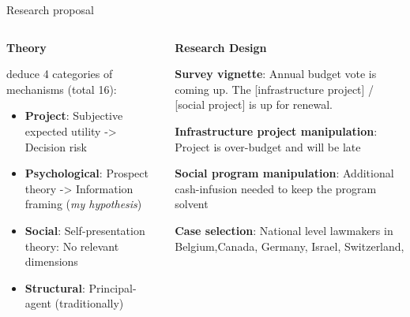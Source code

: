 \begin{frame}{Research proposal}

\begin{columns}
  \begin{column}[T]{0.475\textwidth}
    \textbf{\color{kon4}Theory}

    \vspace*{0.2cm}

  \textcite[][]{Sleesman2012} deduce 4 categories of mechanisms (total 16):
  \begin{itemize}
    \item \textbf{Project}: Subjective expected utility -> Decision risk
    \item \textbf{Psychological}: Prospect theory -> Information framing (\textit{my hypothesis})
    \item \textbf{Social}: Self-presentation theory: No relevant dimensions
    \item \textbf{Structural}: Principal-agent (traditionally)
  \end{itemize}







    
  \end{column}

  \begin{column}[T]{0.475\textwidth}

    \textbf{\color{kon4}Research Design}

    \vspace*{0.2cm}

    \textbf{Survey vignette}: Annual budget vote is coming up. The [infrastructure project] / [social project] is up for renewal.

    \textbf{Infrastructure project manipulation}: Project is over-budget and will be late

    \vspace{0.2cm}

    \textbf{Social program manipulation}: Additional cash-infusion needed to keep the program solvent 

    \vspace{0.2cm}

    \textbf{Case selection}: National level lawmakers in Belgium,Canada, Germany, Israel, Switzerland,  


    \vspace{0.2cm}
  \end{column}
\end{columns}


\end{frame}

